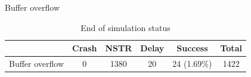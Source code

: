 \begin{frame}{Buffer overflow}
    \begin{table}
        \centering
        \small
        \caption{End of simulation status}
        \label{table:end_sim_by_status}
        \begin{tabular}{@{}rccccc@{}}
            \toprule
                            & Crash & NSTR & Delay & Success     & Total \\
            \midrule
            Buffer overflow & 0     & 1380 & 20    & 24 (1.69\%) & 1422  \\
            \bottomrule
        \end{tabular}
    \end{table}


\end{frame}
